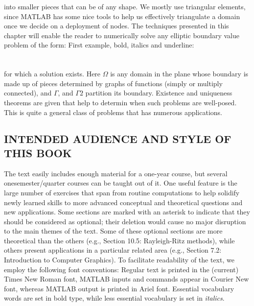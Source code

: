 \documentclass{book}
\begin{document}
into smaller pieces that can be of any shape. We mostly use triangular elements,
since MATLAB has some nice tools to help us effectively triangulate a domain
once we decide on a deployment of nodes. The techniques presented in this
chapter will enable the reader to numerically solve any elliptic boundary value
problem of the form: 
First example, bold, italics and underline:
\\
\\
\\
for which a solution exists. Here $\Omega$ is any domain in the plane whose boundary is
made up of pieces determined by graphs of functions (simply or multiply
connected), and $\Gamma$, and $\Gamma2$ partition its boundary. Existence and uniqueness
theorems are given that help to determin when such problems are well-posed.
This is quite a general class of problems that has numerous applications.

\subsection*{INTENDED AUDIENCE AND STYLE OF THIS BOOK}

\noindent The text easily includes enough material for a one-year course, but several onesemester/quarter courses can be taught out of it. One useful feature is the large
number of exercises that span from routine computations to help solidify newly learned skills to more advanced conceptual and theoretical questions and new
applications. Some sections are marked with an asterisk to indicate that they
should be considered as optional; their deletion would cause no major disruption
to the main themes of the text. Some of these optional sections are more
theoretical than the others (e.g., Section 10.5: Rayleigh-Ritz methods), while
others present applications in a particular related area (e.g., Section 7.2:
Introduction to Computer Graphics). To facilitate readability of the text, we
employ the following font conventions: Regular text is printed in the (current)
Times New Roman font, MATLAB inputs and commands appear in {\selectfont Courier New font}, whereas MATLAB output is printed in {\selectfont Ariel font}. Essential
vocabulary words are set in bold type, while less essential vocabulary is set in
\emph{italics}.
\end{document}
